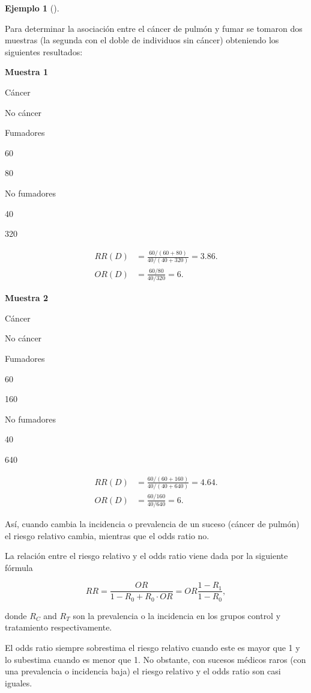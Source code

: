 \documentclass[
  a4paper,
]{scrreport}
\theoremstyle{plain}
\theoremstyle{definition}
\theoremstyle{definition}
\newtheorem{example}{Ejemplo}[chapter]
\theoremstyle{remark}
\begin{document}
\begin{example}[]\protect\hypertarget{exm-riesgo-relativo-vs-odds-ratio}{}\label{exm-riesgo-relativo-vs-odds-ratio}

Para determinar la asociación entre el cáncer de pulmón y fumar se
tomaron dos muestras (la segunda con el doble de individuos sin cáncer)
obteniendo los siguientes resultados:

\textbf{Muestra 1}

Cáncer

No cáncer

Fumadores

60

80

No fumadores

40

320

\begin{align*}
RR(D) &= \frac{60/(60+80)}{40/(40+320)} = 3.86.\\
OR(D) &= \frac{60/80}{40/320} = 6. 
\end{align*}

\textbf{Muestra 2}

Cáncer

No cáncer

Fumadores

60

160

No fumadores

40

640

\begin{align*}
RR(D) &= \frac{60/(60+160)}{40/(40+640)} = 4.64.\\
OR(D) &= \frac{60/160}{40/640} = 6. 
\end{align*}

Así, cuando cambia la incidencia o prevalencia de un suceso (cáncer de
pulmón) el riesgo relativo cambia, mientras que el odds ratio no.

\end{example}

La relación entre el riesgo relativo y el odds ratio viene dada por la
siguiente fórmula

\[RR = \frac{OR}{1-R_0+R_0\cdot OR} = OR \frac{1-R_1}{1-R_0},\]

donde \(R_C\) and \(R_T\) son la prevalencia o la incidencia en los
grupos control y tratamiento respectivamente.

El odds ratio siempre sobrestima el riesgo relativo cuando este es mayor
que 1 y lo subestima cuando es menor que 1. No obstante, con sucesos
médicos raros (con una prevalencia o incidencia baja) el riesgo relativo
y el odds ratio son casi iguales.
\end{document}
